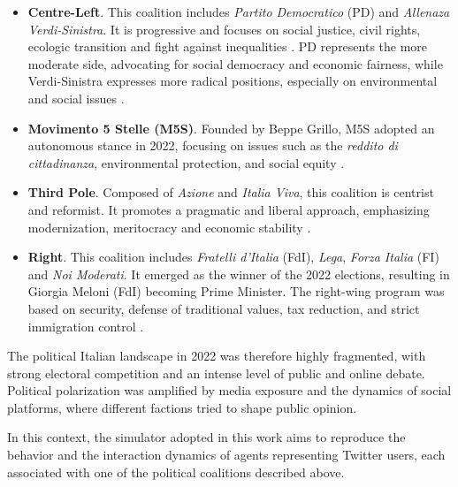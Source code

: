 \begin{itemize}
    \item \textbf{Centre-Left}. This coalition includes \textit{Partito Democratico} (PD) and \textit{Allenaza Verdi-Sinistra}. It is progressive and focuses on social justice, civil rights, ecologic transition and fight against inequalities \cite{wired2022elezioni12punti, ilpost2022partiti}.
    PD represents the more moderate side, advocating for social democracy and economic fairness, while Verdi-Sinistra expresses more radical positions, especially on environmental and social issues \cite{pierri2024drivers}.

    \item \textbf{Movimento 5 Stelle (M5S)}. Founded by Beppe Grillo, M5S adopted an autonomous stance in 2022, focusing on issues such as the \textit{reddito di cittadinanza}, environmental protection, and social equity \cite{pierri2023ita, wired2022elezioni12punti}.

    \item \textbf{Third Pole}. Composed of \textit{Azione} and \textit{Italia Viva}, this coalition is centrist and reformist. 
    It promotes a pragmatic and liberal approach, emphasizing modernization, meritocracy and economic stability \cite{pierri2024drivers, ilpost2022partiti}.

    \item \textbf{Right}. This coalition includes \textit{Fratelli d'Italia} (FdI), \textit{Lega}, \textit{Forza Italia} (FI) and \textit{Noi Moderati}.
    It emerged as the winner of the 2022 elections, resulting in Giorgia Meloni (FdI) becoming Prime Minister.
    The right-wing program was based on security, defense of traditional values, tax reduction, and strict immigration control \cite{wired2022elezioni12punti, ilpost2022partiti, pagellapolitica2022confronto}.
\end{itemize}

The political Italian landscape in 2022 was therefore highly fragmented, with strong electoral competition and an intense level of public and online debate.
Political polarization was amplified by media exposure and the dynamics of social platforms, where different factions tried to shape public opinion.

\medskip
In this context, the simulator adopted in this work aims to reproduce the behavior and the interaction dynamics of agents representing Twitter users, each associated with one of the political coalitions described above.
